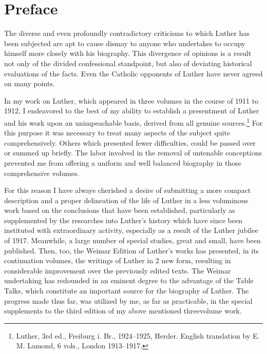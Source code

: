 \chapter*{Preface} %

The diverse and even profoundly contradictory criticisms to which
Luther has been subjected are apt to cause dismay to anyone who
undertakes to occupy himself more closely with his biography. This
divergence of opinions is a result not only of the divided confessional standpoint, but also of deviating historical evaluations of the
facts. Even the Catholic opponents of Luther have never agreed on many points.

In my work on Luther, which appeared in three volumes in the course of 1911 to 1912,
I endeavored to the best of my ability to establish a presentment of Luther and his work upon an unimpeachable basis,
derived from all genuine sources.\footnote{Luther, 3rd ed., Freiburg i. Br., 1924--1925, Herder. English translation by E. M. Lamond, 6 vols., London 1913--1917.}
For this purpose it was necessary to treat many aspects of the subject quite comprehensively. Others which presented fewer difficulties, could be passed over
or summed up briefly. The labor involved in the removal of untenable
conceptions prevented me from offering a uniform and well balanced biography in those comprehensive volumes.

For this reason I have always cherished a desire of submitting a
more compact description and a proper delineation of the life of
Luther in a less voluminous work based on the conclusions that
have been established, particularly as supplemented by the researches
into Luther’s history which have since been instituted with extraordinary activity, especially as a result of the Luther jubilee of
1917. Meanwhile, a large number of special studies, great and small,
have been published. Then, too, the Weimar Edition of Luther’s
works has presented, in its continuation volumes, the writings of Luther in 2 new form, resulting in considerable improvement over the
previously edited texts. The Weimar undertaking has redounded in
an eminent degree to the advantage of the Table Talks, which constitute an important source for the biography of Luther.
The progress made thus far, was utilized by me, as far as practicable, in the special supplements to the third edition of my above mentioned threevolume work.

